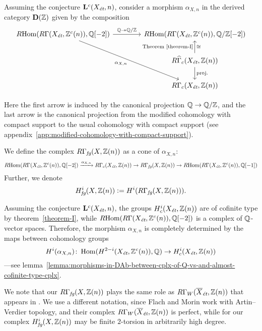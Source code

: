 \documentclass{article}
\numberwithin{equation}{section}
\begin{document}
\begin{definition}
  \label{def:RGamma-fg}
  Assuming the conjecture $\mathbf{L}^c (X_\et,n)$, consider a morphism
  $\alpha_{X,n}$ in the derived category $\mathbf{D} (\ZZ)$ given by the
  composition
  \[ \begin{tikzcd}[column sep=4em]
    \RHom (R\Gamma (X_\et, \ZZ^c (n)), \QQ[-2]) \ar{r}{\QQ \twoheadrightarrow \QQ/\ZZ}\ar{ddr}[swap]{\alpha_{X,n}} & \RHom (R\Gamma (X_\et, \ZZ^c (n)), \QQ/\ZZ[-2]) \\
    & R\widehat{\Gamma}_c (X_\et, \ZZ (n)) \ar{u}{\text{Theorem \ref{theorem-I}}}[swap]{\cong} \ar{d}{\text{proj.}} \\
    & R\Gamma_c (X_\et, \ZZ (n))
  \end{tikzcd} \]

  Here the first arrow is induced by the canonical projection $\QQ \to \QQ/\ZZ$,
  and the last arrow is the canonical projection from the modified cohomology
  with compact support to the usual cohomology with compact support
  (see appendix~\ref{app:modified-cohomology-with-compact-support}).

  We define the complex $R\Gamma_\fg (X, \ZZ(n))$ as a cone of $\alpha_{X,n}$:
  \[ \RHom (R\Gamma (X_\et, \ZZ^c (n)), \QQ [-2]) \xrightarrow{\alpha_{X,n}}
    R\Gamma_c (X_\et, \ZZ (n)) \to
    R\Gamma_\fg (X, \ZZ(n)) \to
    \RHom (R\Gamma (X_\et, \ZZ^c (n)), \QQ [-1]) \]
  Further, we denote
  $$H^i_\fg (X, \ZZ (n)) \dfn H^i (R\Gamma_\fg (X, \ZZ (n))).$$
\end{definition}

\begin{remark}
  \label{rmk:alpha-X-n-determined-by-cohomology}
  Assuming the conjecture $\mathbf{L}^c (X_\et, n)$, the groups
  $H^i_c (X_\et, \ZZ (n))$ are of cofinite type by theorem~\ref{theorem-I},
  while $\RHom (R\Gamma (X_\et, \ZZ^c (n)), \QQ [-2])$ is a complex of
  $\QQ$-vector spaces. Therefore, the morphism $\alpha_{X,n}$ is completely
  determined by the maps between cohomology groups
  \[ H^i (\alpha_{X,n})\colon
    \Hom (H^{2-i} (X_\et, \ZZ^c (n)), \QQ) \to
    H^i_c (X_\et, \ZZ (n)) \]
  ---see lemma~\ref{lemma:morphisms-in-DAb-between-cplx-of-Q-vs-and-almost-cofinite-type-cplx}.
\end{remark}

\begin{remark}
  We note that our $R\Gamma_\fg (X, \ZZ (n))$ plays the same role as
  $R\Gamma_W (\overline{X}_\et, \ZZ (n))$ that appears in
  \cite[Definition~3.6]{Flach-Morin-2018}. We use a different notation, since
  Flach and Morin work with Artin--Verdier topology, and their complex
  $R\Gamma_W (\overline{X}_\et, \ZZ (n))$ is perfect, while for our complex
  $H^i_\fg (X, \ZZ (n))$ may be finite $2$-torsion in arbitrarily high degree.
\end{remark}
\end{document}

